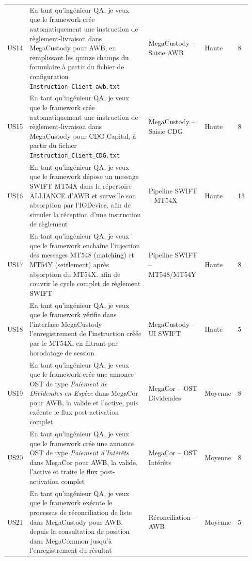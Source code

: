\documentclass[12pt, a4paper]{report}
\begin{document}
\begin{longtable}{p{0.9cm} p{6.0cm} p{2.6cm} p{1.5cm} p{0.9cm}}
US14 & En tant qu'ingénieur QA, je veux que le framework crée automatiquement une instruction de règlement-livraison dans MegaCustody pour AWB, en remplissant les quinze champs du formulaire à partir du fichier de configuration \texttt{Instruction\_Client\_awb.txt}
      & MegaCustody – Saisie AWB & Haute & 8 \\[4pt]

US15 & En tant qu'ingénieur QA, je veux que le framework crée automatiquement une instruction de règlement-livraison dans MegaCustody pour CDG Capital, à partir du fichier \texttt{Instruction\_Client\_CDG.txt}
      & MegaCustody – Saisie CDG & Haute & 8 \\[4pt]

US16 & En tant qu'ingénieur QA, je veux que le framework dépose un message SWIFT MT54X dans le répertoire ALLIANCE d'AWB et surveille son absorption par l'IODevice, afin de simuler la réception d'une instruction de règlement
      & Pipeline SWIFT – MT54X & Haute & 13 \\[4pt]

US17 & En tant qu'ingénieur QA, je veux que le framework enchaîne l'injection des messages MT548 (matching) et MT54Y (settlement) après absorption du MT54X, afin de couvrir le cycle complet de règlement SWIFT
      & Pipeline SWIFT – MT548/MT54Y & Haute & 8 \\[4pt]

US18 & En tant qu'ingénieur QA, je veux que le framework vérifie dans l'interface MegaCustody l'enregistrement de l'instruction créée par le MT54X, en filtrant par horodatage de session
      & MegaCustody – UI SWIFT & Haute & 5 \\[4pt]

US19 & En tant qu'ingénieur QA, je veux que le framework crée une annonce OST de type \textit{Paiement de Dividendes en Espèce} dans MegaCor pour AWB, la valide et l'active, puis exécute le flux post-activation complet
      & MegaCor – OST Dividendes & Moyenne & 8 \\[4pt]

US20 & En tant qu'ingénieur QA, je veux que le framework crée une annonce OST de type \textit{Paiement d'Intérêts} dans MegaCor pour AWB, la valide, l'active et traite le flux post-activation complet
      & MegaCor – OST Intérêts & Moyenne & 8 \\[4pt]

US21 & En tant qu'ingénieur QA, je veux que le framework exécute le processus de réconciliation de liste dans MegaCustody pour AWB, depuis la consultation de position dans MegaCommon jusqu'à l'enregistrement du résultat
      & Réconciliation – AWB & Moyenne & 5 \\[4pt]


\end{longtable}
\end{document}
